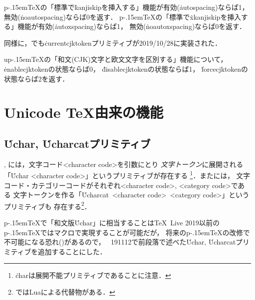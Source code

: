 \documentclass[a4paper,11pt,nomag,dvipdfmx]{jsarticle}
\def\upTeX{u\pTeX}\def\pTeX{p\kern-.15em\TeX}
\begin{document}
\begin{cslist}
  \pTeX の「標準で\.{kanjiskip}を挿入する」機能が有効(\.{autospacing})ならば1，
  無効(\.{noautospacing})ならば0を返す．
  \pTeX の「標準で\.{xkanjiskip}を挿入する」機能が有効(\.{autoxspacing})ならば1，
  無効(\.{noautoxspacing})ならば0を返す．
\end{cslist}

同様に，\eupTeX でも\.{currentcjktoken}プリミティブが2019/10/28に実装された．

\begin{cslist}
  \upTeX の「和文(CJK)文字と欧文文字を区別する」機能について，
  \.{enablecjktoken}の状態ならば0，
  \.{disablecjktoken}の状態ならば1，
  \.{forcecjktoken}の状態ならば2を返す．
\end{cslist}


\section{Unicode \TeX 由来の機能}

\subsection{\.{Uchar}, \.{Ucharcat}プリミティブ}
, には，文字コード<character code>を引数にとり
\emph{文字トークン}に展開される「\.{Uchar} <character code>」というプリミティブが存在する
\footnote{\.{char}は展開不能プリミティブであることに注意．}．またには，
文字コード・カテゴリーコードがそれぞれ<character code>, <category code>である
文字トークンを作る「\.{Ucharcat}~<character code>~<category code>」というプリミティブも
存在する\footnote{ではLuaによる代替物がある．}．

\pTeX で「和文版\.{Uchar}」に相当することは\TeX~Live 2019以前の\pTeX ではマクロで実現することが可能だが，
将来の\pTeX の改修で不可能になる恐れ(\cite{tjb81,tjb95})があるので，
\epTeX~191112で前段落で述べた\.{Uchar}, \.{Ucharcat}プリミティブを追加することにした．
\end{document}
